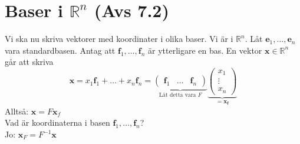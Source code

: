 \section{Baser i $\mathbb{R}^{n}$ (Avs 7.2)}
Vi ska nu skriva vektorer med koordinater i olika baser.
Vi är i $\mathbb{R}^{n}$. Låt $\bm{e}_{1},\ldots,\bm{e}_{n}$ vara standardbasen.
Antag att $\bm{f}_{1},\ldots,\bm{f}_{n}$ är ytterligare en bas.
En vektor $\bm{x}\in\mathbb{R}^{n}$ går att skriva
\begin{equation*}
    \bm{x}=x_{1}\bm{f}_{1}+\ldots+x_{n}\bm{f}_{n}=
    \underbrace{\begin{pmatrix}\bm{f}_{1}&\ldots&\bm{f}_{n}\end{pmatrix}}_{\text{Låt detta vara } F}
    \underbrace{\begin{pmatrix}x_{1}\\\vdots\\x_{n}\end{pmatrix}}_{=\bm{x_{f}}}
\end{equation*}
Alltså: $\bm{x}=F\bm{x}_{f}$\\
Vad är koordinaterna i basen $\bm{f}_1,\ldots,\bm{f}_n$?\\
Jo: $\bm{x}_F=F^{-1}\bm{x}$

